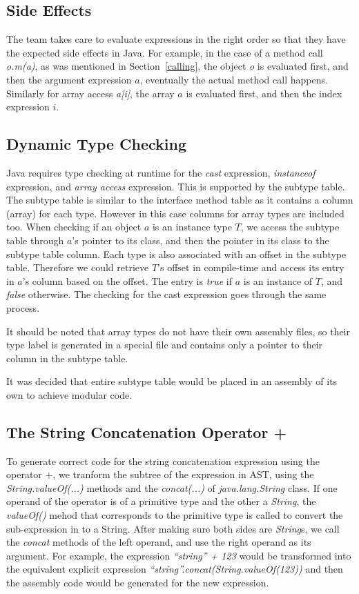 \documentclass[a4paper, notitlepage]{report}
\begin{document}
\subsection{Side Effects}

The team takes care to evaluate expressions in the right order so that they have the expected side effects in Java. For example, in the case of a method call \emph{o.m(a)}, as was mentioned in Section~\ref{calling}, the object \emph{o} is evaluated first, and then the argument expression $a$, eventually the actual method call happens. Similarly for array access \emph{a[i]}, the array $a$ is evaluated first, and then the index expression $i$.

\subsection{Dynamic Type Checking}
\label{type_check}

Java requires type checking at runtime for the \emph{cast} expression, \emph{instanceof} expression, and \emph{array access} expression. This is supported by the subtype table. The subtype table is similar to the interface method table as it contains a column (array) for each type. However in this case columns for array types are included too. When checking if an object $a$ is an instance type $T$, we access the subtype table through $a$'s pointer to its class, and then the pointer in its class to the subtype table column. Each type is also associated with an offset in the subtype table. Therefore we could retrieve $T$'s offset in compile-time and access its entry in $a$'s column based on the offset. The entry is \emph{true} if $a$ is an instance of $T$, and \emph{false} otherwise. The checking for the cast expression goes through the same process.

It should be noted that array types do not have their own assembly files, so their type label is generated in a special file and contains only a pointer to their column in the subtype table.

It was decided that entire subtype table would be placed in an assembly of its own to achieve modular code.

\subsection{The String Concatenation Operator +}

To generate correct code for the string concatenation expression using the operator +, we tranform the subtree of the expression in AST, using the \emph{String.valueOf(...)} methods and the \emph{concat(...)} of \emph{java.lang.String} class. If one operand of the operator is of a primitive type and the other a \emph{String}, the \emph{valueOf()} mehod that corresponds to the primitive type is called to convert the sub-expression in to a String. After making sure both sides are \emph{String}s, we call the \emph{concat} methods of the left operand, and use the right operand as its argument. For example, the expression \emph{``string'' + 123} would be transformed into the equivalent explicit expression \emph{``string''.concat(String.valueOf(123))} and then the assembly code would be generated for the new expression. 
\end{document}
